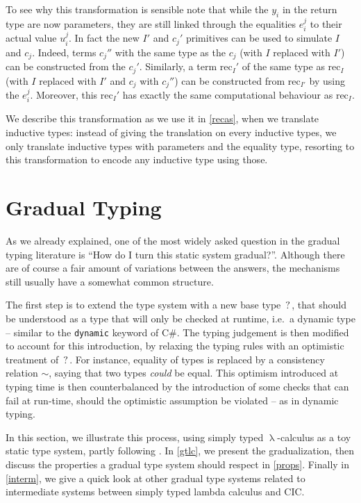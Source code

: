 \documentclass[en]{myarticle}
\renewcommand{\mathtt}{\mathrm}
\newcommand{\cons}{\sim}
\DeclareMathOperator{\?}{?}
\renewcommand{\l}{\operatorname{\lambda}}
\newcommand{\rec}{\mathtt{rec}}
\begin{document}
{To see why this transformation is sensible note that while the $y_i$ in the return type are now parameters, they are still linked through the equalities $e_i^j$ to their actual value $u_i^j$.
In fact the new $I'$ and $c_j'$ primitives can be used to simulate $I$ and $c_j$.  Indeed, terms $c_j''$ with the same type as the $c_j$ (with $I$ replaced with $I'$) can be constructed from the $c_j'$. Similarly, a term $\rec_I'$ of the same type as $\rec_I$ (with $I$ replaced with $I'$ and $c_j$ with $c_j''$) can be constructed from $\rec_{I'}$ by using the $e_i^j$. Moreover, this $\rec_I'$ has exactly the same computational behaviour as $\rec_I$.

We describe this transformation as we use it in \autoref{recas}, when we translate inductive types: instead of giving the translation on every inductive types, we only translate inductive types with parameters and the equality type, resorting to this transformation to encode any inductive type using those.

\section{Gradual Typing}
\label{GT}

As we already explained, one of the most widely asked question in the gradual typing literature is “How do I turn this static system gradual?”. Although there are of course a fair amount of variations between the answers, the mechanisms still usually have a somewhat common structure.

The first step is to extend the type system with a new base type $\?$, that should be understood as a type that will only be checked at runtime, i.e.\ a dynamic type – similar to the \texttt{dynamic} keyword of C\#. The typing judgement is then modified to account for this introduction, by relaxing the typing rules with an optimistic treatment of $\?$. For instance, equality of types is replaced by a consistency relation $\cons$, saying that two types \emph{could} be equal. This optimism introduced at typing time is then counterbalanced by the introduction of some checks that can fail at run-time, should the optimistic assumption be violated – as in dynamic typing.

In this section, we illustrate this process, using simply typed $\l$-calculus as a toy static type system, partly following \cite{Siek2015}. In \autoref{gtlc}, we present the gradualization, then discuss the properties a gradual type system should respect in \autoref{props}. Finally in \autoref{interm}, we give a quick look at other gradual type systems related to intermediate systems between simply typed lambda calculus and CIC.

}
\end{document}
